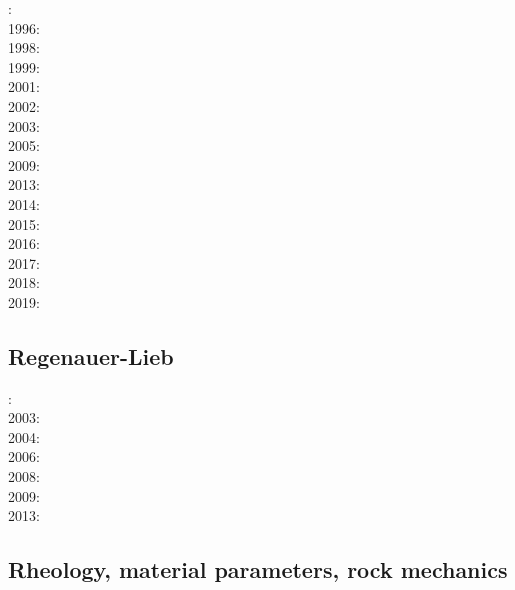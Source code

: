 : \cite{rich94}\\
1996: \cite{zhgm96}\\
1998: \cite{bisp98}\cite{most98}\\
1999: \cite{most99}\\
2001: \cite{vapy01}\\
2002: \cite{foul02}\\
2003: \cite{vazh03}\\
2005: \cite{bugu05}\\
2009: \cite{bucl09}\cite{zhgy09}\cite{baiv10}\\
2013: \cite{bemm12}\cite{brps13}\\
2014: \cite{buge14}\cite{gery14b}\cite{buto14}\cite{buit14}\\
2015: \cite{bemm15}\cite{gesb15}\cite{kocb15}\cite{meds15}\\
2016: \cite{fige16}\cite{gadb16}\cite{kobc16}\\
2017: \cite{bahf17}\cite{brsg17}\cite{bahf17}\cite{bekb17}\cite{kocb17}\\
2018: \cite{daga18}\\
2019: \cite{kobg19}

\subsection*{Regenauer-Lieb}

: \cite{reyu00}\\
2003: \cite{reyu03}\\
2004: \cite{reyu04}\\
2006: \cite{rehy06}\cite{rewr06}\\
2008: \cite{rerw08}\\
2009: \cite{reps09}\\
2013: \cite{revp13}

\subsection*{Rheology, material parameters, rock mechanics}

